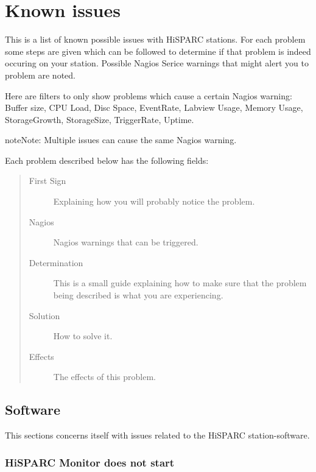\documentclass[a4paper,11pt,english]{sphinxmanual}
\begin{document}
\chapter{Known issues}
\label{known-issues:known-issues}\label{known-issues::doc}
This is a list of known possible issues with HiSPARC stations. For each problem some steps are given which can be followed to determine if that problem is indeed occuring on your station. Possible Nagios Serice warnings that might alert you to problem are noted.

Here are filters to only show problems which cause a certain Nagios warning:
Buffer size,
CPU Load,
Disc Space,
EventRate,
Labview Usage,
Memory Usage,
StorageGrowth,
StorageSize,
TriggerRate,
Uptime.

\begin{notice}{note}{Note:}
Multiple issues can cause the same Nagios warning.
\end{notice}

Each problem described below has the following fields:
\begin{quote}\begin{description}
\item[{First Sign}] \leavevmode
Explaining how you will probably notice the problem.

\item[{Nagios}] \leavevmode
Nagios warnings that can be triggered.

\item[{Determination}] \leavevmode
This is a small guide explaining how to make sure that the problem being described is what you are experiencing.

\item[{Solution}] \leavevmode
How to solve it.

\item[{Effects}] \leavevmode
The effects of this problem.

\end{description}\end{quote}


\section{Software}
\label{known-issues:software}
This sections concerns itself with issues related to the HiSPARC
station-software.


\subsection{HiSPARC Monitor does not start}
\label{known-issues:hisparc-monitor-does-not-start}
\end{document}
